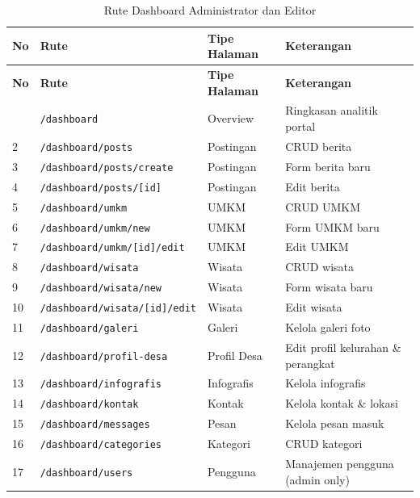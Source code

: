 \documentclass[12pt,a4paper]{report}
\begin{document}
\begin{longtable}{p{} p{} p{} p{}}
    \caption{Rute Dashboard Administrator dan Editor}\\
    \toprule
    \textbf{No} & \textbf{Rute} & \textbf{Tipe Halaman} & \textbf{Keterangan} \\
    \midrule
    \endfirsthead
    \toprule
    \textbf{No} & \textbf{Rute} & \textbf{Tipe Halaman} & \textbf{Keterangan} \\
    \midrule
    \endhead
    \bottomrule
    \endfoot
    1 & \texttt{/dashboard} & Overview & Ringkasan analitik portal \\
    2 & \texttt{/dashboard/posts} & Postingan & CRUD berita \\
    3 & \texttt{/dashboard/posts/create} & Postingan & Form berita baru \\
    4 & \texttt{/dashboard/posts/[id]} & Postingan & Edit berita \\
    5 & \texttt{/dashboard/umkm} & UMKM & CRUD UMKM \\
    6 & \texttt{/dashboard/umkm/new} & UMKM & Form UMKM baru \\
    7 & \texttt{/dashboard/umkm/[id]/edit} & UMKM & Edit UMKM \\
    8 & \texttt{/dashboard/wisata} & Wisata & CRUD wisata \\
    9 & \texttt{/dashboard/wisata/new} & Wisata & Form wisata baru \\
    10 & \texttt{/dashboard/wisata/[id]/edit} & Wisata & Edit wisata \\
    11 & \texttt{/dashboard/galeri} & Galeri & Kelola galeri foto \\
    12 & \texttt{/dashboard/profil-desa} & Profil Desa & Edit profil kelurahan \& perangkat \\
    13 & \texttt{/dashboard/infografis} & Infografis & Kelola infografis \\
    14 & \texttt{/dashboard/kontak} & Kontak & Kelola kontak \& lokasi \\
    15 & \texttt{/dashboard/messages} & Pesan & Kelola pesan masuk \\
    16 & \texttt{/dashboard/categories} & Kategori & CRUD kategori \\
    17 & \texttt{/dashboard/users} & Pengguna & Manajemen pengguna (admin only) \\
    \end{longtable}

\clearpage
\end{document}
